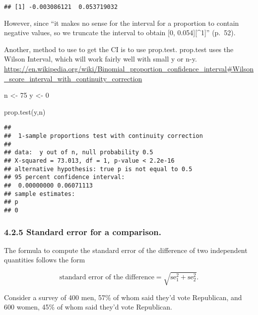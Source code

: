 \documentclass[
]{article}
\newenvironment{Shaded}{\begin{snugshade}}{\end{snugshade}}
\newcommand{\DecValTok}[1]{\textcolor[rgb]{0.00,0.00,0.81}{#1}}
\newcommand{\FunctionTok}[1]{\textcolor[rgb]{0.00,0.00,0.00}{#1}}
\newcommand{\NormalTok}[1]{#1}
\newcommand{\OtherTok}[1]{\textcolor[rgb]{0.56,0.35,0.01}{#1}}
\begin{document}
\begin{verbatim}
## [1] -0.003086121  0.053719032
\end{verbatim}

However, since ``it makes no sense for the interval for a proportion to
contain negative values, so we truncate the interval to obtain {[}0,
0.054{]}{[}\^{}1{]}'' (p.~52).

Another, method to use to get the CI is to use prop.test. prop.test uses
the Wilson Interval, which will work fairly well with small y or n-y.
\url{https://en.wikipedia.org/wiki/Binomial_proportion_confidence_interval\#Wilson_score_interval_with_continuity_correction}

\begin{Shaded}
\begin{Highlighting}[]
\NormalTok{n }\OtherTok{\textless{}{-}} \DecValTok{75}
\NormalTok{y }\OtherTok{\textless{}{-}} \DecValTok{0}

\FunctionTok{prop.test}\NormalTok{(y,n)}
\end{Highlighting}
\end{Shaded}

\begin{verbatim}
## 
##  1-sample proportions test with continuity correction
## 
## data:  y out of n, null probability 0.5
## X-squared = 73.013, df = 1, p-value < 2.2e-16
## alternative hypothesis: true p is not equal to 0.5
## 95 percent confidence interval:
##  0.00000000 0.06071113
## sample estimates:
## p 
## 0
\end{verbatim}

\hypertarget{standard-error-for-a-comparison.}{%
\subsubsection{4.2.5 Standard error for a
comparison.}\label{standard-error-for-a-comparison.}}

The formula to compute the standard error of the difference of two
independent quantities follows the form

\[\text{standard error of the difference} = \sqrt{\text{se}_1^2 + \text{se}_2^2}.\]

Consider a survey of 400 men, 57\% of whom said they'd vote Republican,
and 600 women, 45\% of whom said they'd vote Republican.
\end{document}
